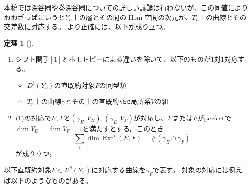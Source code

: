 \documentclass[uplatex,11pt,a4paper,dvipdfmx]{jsarticle}
\numberwithin{equation}{section}
\theoremstyle{definition}
\newtheorem{theorem}{定理}[section]
\DeclareMathOperator{\Hom}{\mathrm{Hom}}
\DeclareMathOperator{\Ext}{\mathrm{Ext}}
\begin{document}
本稿では深谷圏や巻深谷圏についての詳しい議論は行わないが、この同値によりおおざっぱにいうと$Y_n$上の層とその間の$\Hom$空間の次元が、$T_n$上の曲線とその交差数に対応する。
より正確には、以下が成り立つ。
\begin{theorem}[\cite{2020arXiv201108288O}]
    \begin{enumerate}
        \item シフト関手$[1]$とホモトピーによる違いを除いて、以下のものが1対1対応する。\begin{itemize}
                  \item $D^b(Y_n)$の直既約対象$F$の同型類
                  \item $T_n$上の曲線$\gamma$とその上の直既約$\bC$局所系$V$の組
              \end{itemize}
        \item (1)の対応で$E,F$と$(\gamma_E, V_E), (\gamma_E, V_F)$が対応し、$E$または$F$がperfectで$\dim V_E = \dim V_F = 1$を満たすとする。このとき\begin{equation}
                  \sum_{i}\dim\Ext^i(E, F) = \#(\gamma_E \cap \gamma_F)
              \end{equation}が成り立つ。
    \end{enumerate}
\end{theorem}
以下直既約対象$F \in D^b(Y_n)$に対応する曲線を$\gamma_F$で表す。
対象の対応には例えば以下のようなものがある。
\end{document}
